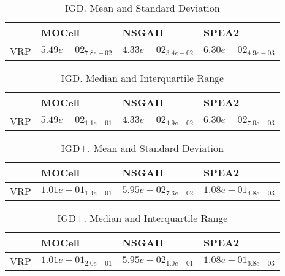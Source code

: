 \documentclass{article}
\begin{document}
\begin{table}
\caption{IGD. Mean and Standard Deviation}
\label{table: IGD}
\centering
\begin{scriptsize}
\begin{tabular}{llll}
\hline & MOCell & NSGAII &  SPEA2\\
\hline 
VRP & \cellcolor{gray25}$  5.49e-02_{ 7.8e-02}$ & \cellcolor{gray95}$  4.33e-02_{ 3.4e-02}$ & $  6.30e-02_{ 4.9e-03}$ \\
\hline
\end{tabular}
\end{scriptsize}
\end{table}

\begin{table}
\caption{IGD. Median and Interquartile Range}
\label{table: IGD}
\centering
\begin{scriptsize}
\begin{tabular}{llll}
\hline & MOCell & NSGAII &  SPEA2\\
\hline 
VRP & \cellcolor{gray25}$  5.49e-02_{ 1.1e-01}$ & \cellcolor{gray95}$  4.33e-02_{ 4.9e-02}$ & $  6.30e-02_{ 7.0e-03}$ \\
\hline
\end{tabular}
\end{scriptsize}
\end{table}

\begin{table}
\caption{IGD+. Mean and Standard Deviation}
\label{table: IGD+}
\centering
\begin{scriptsize}
\begin{tabular}{llll}
\hline & MOCell & NSGAII &  SPEA2\\
\hline 
VRP & \cellcolor{gray25}$  1.01e-01_{ 1.4e-01}$ & \cellcolor{gray95}$  5.95e-02_{ 7.3e-02}$ & $  1.08e-01_{ 4.8e-03}$ \\
\hline
\end{tabular}
\end{scriptsize}
\end{table}

\begin{table}
\caption{IGD+. Median and Interquartile Range}
\label{table: IGD+}
\centering
\begin{scriptsize}
\begin{tabular}{llll}
\hline & MOCell & NSGAII &  SPEA2\\
\hline 
VRP & \cellcolor{gray25}$  1.01e-01_{ 2.0e-01}$ & \cellcolor{gray95}$  5.95e-02_{ 1.0e-01}$ & $  1.08e-01_{ 6.8e-03}$ \\
\hline
\end{tabular}
\end{scriptsize}
\end{table}
\end{document}
